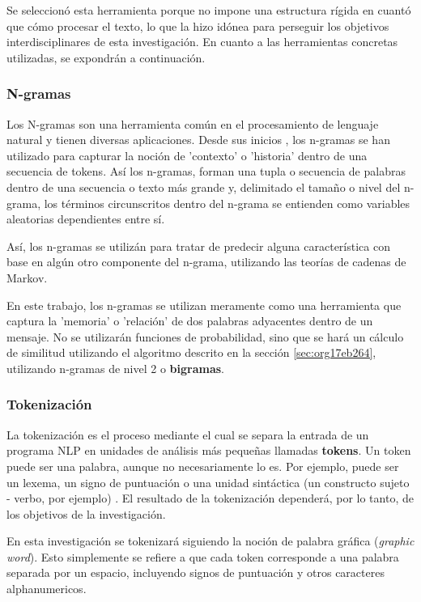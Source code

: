 \documentclass[12pt,letterpaper,twoside]{article}
\begin{document}
Se seleccionó esta herramienta porque no impone una estructura
rígida en cuantó que cómo procesar el texto, lo que la hizo
idónea para perseguir los objetivos interdisciplinares de esta
investigación. En cuanto a las herramientas concretas utilizadas,
se expondrán a continuación.

\subsubsection{N-gramas}
\label{sec:orgac5a927}

Los N-gramas son una herramienta común en el procesamiento
de lenguaje natural y tienen diversas aplicaciones. Desde sus
inicios \cite{manning1999foundations}, los n-gramas se han
utilizado para capturar la noción de 'contexto' o 'historia'
dentro de una secuencia de tokens. Así los n-gramas, forman
una tupla o secuencia de palabras dentro de una secuencia
o texto más grande y, delimitado el tamaño o nivel del
n-grama, los términos circunscritos dentro del n-grama
se entienden como variables aleatorias dependientes entre sí.

Así, los n-gramas se utilizán para tratar de predecir alguna
característica con base en algún otro componente del n-grama,
utilizando las teorías de cadenas de Markov.

En este trabajo, los n-gramas se utilizan meramente
como una herramienta que captura la 'memoria' o 'relación'
de dos palabras adyacentes dentro de un mensaje. No se
utilizarán funciones de probabilidad, sino que se hará
un cálculo de similitud utilizando el algoritmo descrito
en la sección  \ref{sec:org17eb264}, utilizando
n-gramas de nivel 2 o \textbf{bigramas}.


\subsubsection{Tokenización}
\label{sec:orgee193ec}
La tokenización es el proceso mediante el cual se separa la entrada
de un programa NLP en unidades de análisis más pequeñas llamadas
\textbf{tokens}. Un token puede ser una palabra, aunque no necesariamente
lo es. Por ejemplo, puede ser un lexema, un signo de puntuación
o una unidad sintáctica (un constructo sujeto - verbo, por ejemplo)
\cite{manning1999foundations}. El resultado de la tokenización
dependerá, por lo tanto, de los objetivos de la investigación.

En esta investigación se tokenizará siguiendo la noción de
palabra gráfica (\emph{graphic word}). Esto simplemente se refiere
a que cada token corresponde a una palabra separada por un espacio,
incluyendo signos de puntuación y otros caracteres alphanumericos.
\end{document}
